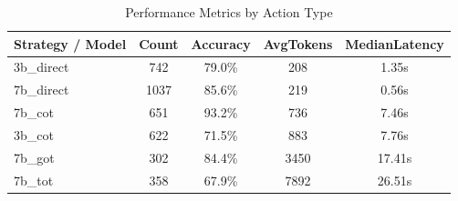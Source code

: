 \begin{table}
\caption{Performance Metrics by Action Type}
\label{tab:performance_metrics}
\begin{tabular}{lcccc}
\toprule
Strategy / Model & Count & Accuracy & AvgTokens & MedianLatency \\
\midrule
3b_direct & 742 & 79.0\% & 208 & 1.35s \\
7b_direct & 1037 & 85.6\% & 219 & 0.56s \\
7b_cot & 651 & 93.2\% & 736 & 7.46s \\
3b_cot & 622 & 71.5\% & 883 & 7.76s \\
7b_got & 302 & 84.4\% & 3450 & 17.41s \\
7b_tot & 358 & 67.9\% & 7892 & 26.51s \\
\bottomrule
\end{tabular}
\end{table}
